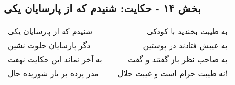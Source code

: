 \begin{center}
\section*{بخش ۱۴ - حکایت: شنیدم که از پارسایان یکی}
\label{sec:014}
\begin{longtable}{l p{0.5cm} r}
شنیدم که از پارسایان یکی
&&
به طیبت بخندید با کودکی
\\
دگر پارسایان خلوت نشین
&&
به عیبش فتادند در پوستین
\\
به آخر نماند این حکایت نهفت
&&
به صاحب نظر باز گفتند و گفت
\\
مدر پرده بر یار شوریده حال
&&
نه طیبت حرام است و غیبت حلال!
\\
\end{longtable}
\end{center}
